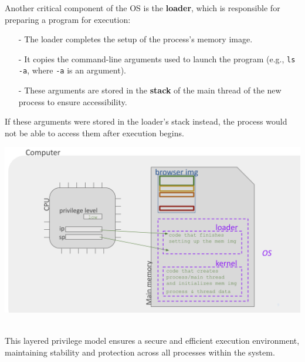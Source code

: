 \documentclass[../../compsys.tex]{subfiles}
\begin{document}
Another critical component of the OS is the \textbf{loader}, which is responsible for preparing a program for execution: \\
\begin{minipage}{0.45\textwidth}
\begin{itemize}
    \item[-] The loader completes the setup of the process's memory image.
    \item[-] It copies the command-line arguments used to launch the program (e.g., \texttt{ls -a}, where \texttt{-a} is an argument).
    \item[-] These arguments are stored in the \textbf{stack} of the main thread of the new process to ensure accessibility.
\end{itemize}
\end{minipage} \hfill \vline \hfill 
\begin{minipage}{0.45\textwidth}
If these arguments were stored in the loader's stack instead, the process would not be able to access them after execution begins.
\begin{center}
    \includegraphics[width=1.1\textwidth]{chapters/L3/images/kernel.png}
\end{center}
\end{minipage} \\[10px]

This layered privilege model ensures a secure and efficient execution environment, maintaining stability and protection across all processes within the system.
\end{document}
